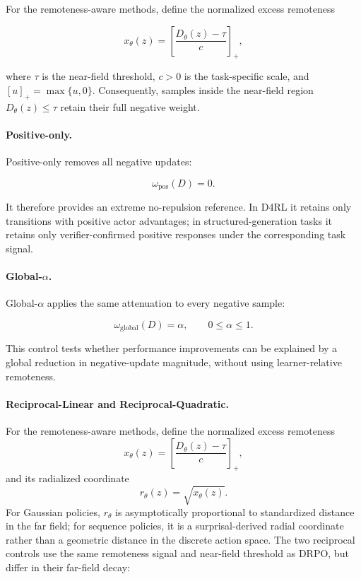 \documentclass{article}
\theoremstyle{plain}
\theoremstyle{definition}
\theoremstyle{remark}
\begin{document}
For the remoteness-aware methods, define the normalized excess
remoteness

\[
x_\theta(z)
=
\left[
\frac{D_\theta(z)-\tau}{c}
\right]_{+},
\]

where \(\tau\) is the near-field threshold, \(c>0\) is the task-specific
scale, and \([u]_{+}=\max\{u,0\}\). Consequently, samples inside the
near-field region \(D_\theta(z)\leq\tau\) retain their full negative
weight.

\paragraph{Positive-only.}

Positive-only removes all negative updates:

\[
\omega_{\mathrm{pos}}(D)=0.
\]

It therefore provides an extreme no-repulsion reference. In D4RL it
retains only transitions with positive actor advantages; in
structured-generation tasks it retains only verifier-confirmed positive
responses under the corresponding task signal.

\paragraph{Global-\(\alpha\).}

Global-\(\alpha\) applies the same attenuation to every negative sample:

\[
\omega_{\mathrm{global}}(D)=\alpha,
\qquad
0\leq\alpha\leq 1.
\]

This control tests whether performance improvements can be explained by
a global reduction in negative-update magnitude, without using
learner-relative remoteness.

\paragraph{Reciprocal-Linear and Reciprocal-Quadratic.}
For the remoteness-aware methods, define the normalized excess
remoteness
\[
x_\theta(z)
=
\left[
\frac{D_\theta(z)-\tau}{c}
\right]_{+},
\]
and its radialized coordinate
\[
r_\theta(z)=\sqrt{x_\theta(z)}.
\]
For Gaussian policies, \(r_\theta\) is asymptotically proportional to
standardized distance in the far field; for sequence policies, it is a
surprisal-derived radial coordinate rather than a geometric distance in
the discrete action space.
The two reciprocal controls use the same remoteness signal and
near-field threshold as DRPO, but differ in their far-field decay:
\end{document}
